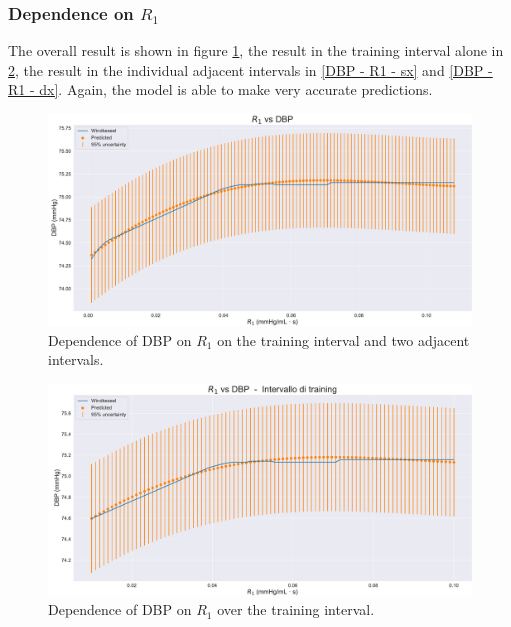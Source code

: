 \newpage

\subsubsection{Dependence on $R_1$}
The overall result is shown in figure \ref{DBP - R1 - full}, the result in the training interval alone in \ref{DBP - R1 - training}, the result in the individual adjacent intervals in \ref{DBP - R1 - sx} and \ref{DBP - R1 - dx}. Again, the model is able to make very accurate predictions.

\vspace{1cm}

\begin{figure}[!htb]
    \centering
    \includegraphics[width=1\textwidth]{images/Training (risultati)/DBP/DBP - R1 - full.pdf}
    \caption{Dependence of DBP on $R_1$ on the training interval and two adjacent intervals.}
    \label{DBP - R1 - full}
\end{figure}

\vspace{0.32cm}

\begin{figure}[!htb]
    \centering
    \includegraphics[width=1\textwidth]{images/Training (risultati)/DBP/DBP - R1 - training.pdf}
    \caption{Dependence of DBP on $R_1$ over the training interval.}
    \label{DBP - R1 - training}
\end{figure}

